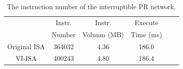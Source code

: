 

  
  


\begin{table}[t]
  \small
  \centering
  \setlength{\abovecaptionskip}{2pt}
  \caption{The instruction number of the interruptible PR network. }
\begin{tabular}{|c|c|c|c|c|c|}
  \hline
         & Instr.  & Instr. & Execute \\
        & Number   & Volunm (MB) & Time (ms) \\
  \hline
  Original ISA   &      364032      & 4.36 & 186.0 \\
  \hline
  VI-ISA   &     400243    & 4.80 & 186.4 \\
  \hline
  \end{tabular}%
  \label{tab:instrnum}%
\end{table}%



